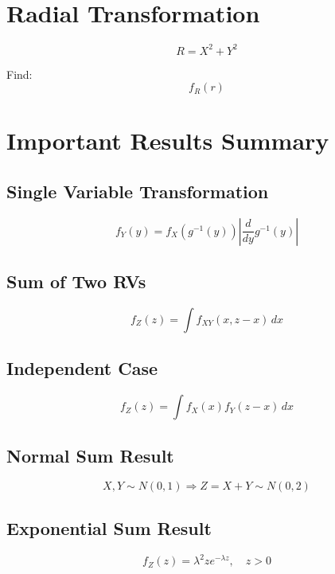 \documentclass[12pt]{article}
\begin{document}
\section{Radial Transformation}

\[
R = X^2 + Y^2
\]

Find:
\[
f_R(r)
\]

\section{Important Results Summary}

\subsection{Single Variable Transformation}

\[
f_Y(y)=
f_X(g^{-1}(y))
\left|
\frac{d}{dy}g^{-1}(y)
\right|
\]

\subsection{Sum of Two RVs}

\[
f_Z(z)=\int f_{XY}(x,z-x)\,dx
\]

\subsection{Independent Case}

\[
f_Z(z)=\int f_X(x)f_Y(z-x)\,dx
\]

\subsection{Normal Sum Result}

\[
X,Y \sim N(0,1)
\Rightarrow
Z=X+Y \sim N(0,2)
\]

\subsection{Exponential Sum Result}

\[
f_Z(z)=\lambda^2 z e^{-\lambda z}, \quad z>0
\]
\end{document}
